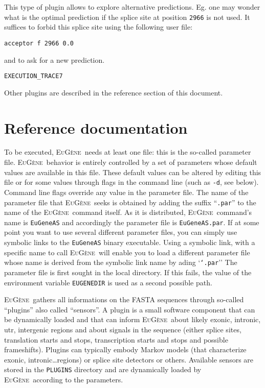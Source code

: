 \documentclass[a4paper,titlepage]{report}
\newcommand{\EuGenie}{\textsc{EuG\`ene}}
\begin{document}
This type of plugin allows to explore alternative predictions. Eg. one
may wonder what is the optimal prediction if the splice site at
position \texttt{2966} is not used. It suffices to forbid this splice
site using the following user file:

\begin{Verbatim}[fontsize=\scriptsize]
acceptor f 2966 0.0
\end{Verbatim}
and to ask for a new prediction.

\begin{Verbatim}[fontsize=\scriptsize]
EXECUTION_TRACE7
\end{Verbatim}

Other plugins are described in the reference section of this document.






\newpage
\chapter{Reference documentation}

To be executed, \EuGenie\ needs at least one file: this is the so-called 
parameter file.  \EuGenie\ behavior
is entirely controlled by a set of parameters whose default values are
available in this file. These default values can be altered by
editing this file or for some values through flags in the command line (such as
\texttt{-d}, see below). Command line flags override any value in the
parameter file. The name of the parameter file that \EuGenie\ seeks is
obtained by adding the suffix ``\texttt{.par}'' to the name of the
\EuGenie\ command itself.  As it is distributed, \EuGenie\ command's
name is \texttt{EuGeneAS} and accordingly the parameter file is
\texttt{EuGeneAS.par}. If at some point you want to use several
different parameter files, you can simply use symbolic links to the
\texttt{EuGeneAS} binary executable. Using a symbolic link, with a
specific name to call \EuGenie\ will enable you to load a different
parameter file whose name is derived from the symbolic link name by
ading `\texttt{`.par}'' The parameter file is first sought in the
local directory.  If this fails, the value of the environment variable
\texttt{EUGENEDIR} is used as a second possible path.

\EuGenie\ gathers all informations on the FASTA sequences through
so-called ``plugins'' also called ``sensors''. A plugin is a small
software component that can be dynamically loaded and that can inform
\EuGenie\ about likely exonic, intronic, utr, intergenic regions and
about signals in the sequence (either splice sites, translation starts
and stops, transcription starts and stops and possible frameshifts).
Plugins can typically embody Markov models (that characterize exonic,
intronic\ldots regions) or splice site detectors or others.  Available
sensors are stored in the \texttt{PLUGINS} directory and are
dynamically loaded by \EuGenie\ according to the parameters.
\end{document}

